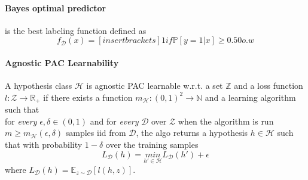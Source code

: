 \paragraph{Bayes optimal predictor} is the best labeling function defined as
\[
	f_{\mathcal{D}}(x) = [insert brackets] 1 if \mathbb{P}[y=1 | x] \geq 0.5
									0 o.w
\]

\paragraph{Agnostic PAC Learnability} A hypothesis class $\mathcal{H}$ is agnostic PAC learnable w.r.t. a set $\mathbb{Z}$ and a loss function $l: \mathcal{Z} \to \mathbb{R}_+$ if there exists a function $m_\mathcal{H}: (0,1)^2 \to \mathbb{N}$ and a learning algorithm such that\\
for \textit{every} $\epsilon, \delta \in (0,1)$ and for  \textit{every} $\mathcal{D}$ over $\mathcal{Z}$ when the algorithm is run $m \geq m_\mathcal{H}(\epsilon, \delta)$ samples iid from $\mathcal{D}$, the algo returns a hypothesis $h \in \mathcal{H}$ such that with probability $1 - \delta$ over the training samples
\[
	L_\mathcal{D}(h) = \underset{h' \in \mathcal{H}}{min} L_\mathcal{D}(h') + \epsilon
\]
where $L_\mathcal{D}(h) = \mathbb{E}_{z\sim\mathcal{D}}[l(h,z)]$.